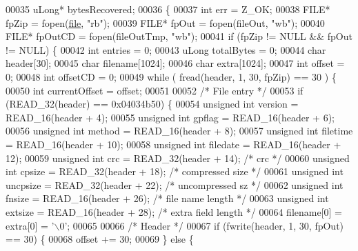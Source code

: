 \begin{DoxyCode}
00035 uLong* bytesRecovered;
00036 \{
00037   \textcolor{keywordtype}{int} err = Z\_OK;
00038   FILE* fpZip = fopen(\hyperlink{structfile}{file}, \textcolor{stringliteral}{"rb"});
00039   FILE* fpOut = fopen(fileOut, \textcolor{stringliteral}{"wb"});
00040   FILE* fpOutCD = fopen(fileOutTmp, \textcolor{stringliteral}{"wb"});
00041   \textcolor{keywordflow}{if} (fpZip != NULL &&  fpOut != NULL) \{
00042     \textcolor{keywordtype}{int} entries = 0;
00043     uLong totalBytes = 0;
00044     \textcolor{keywordtype}{char} header[30];
00045     \textcolor{keywordtype}{char} filename[1024];
00046     \textcolor{keywordtype}{char} extra[1024];
00047     \textcolor{keywordtype}{int} offset = 0;
00048     \textcolor{keywordtype}{int} offsetCD = 0;
00049     \textcolor{keywordflow}{while} ( fread(header, 1, 30, fpZip) == 30 ) \{
00050       \textcolor{keywordtype}{int} currentOffset = offset;
00051 
00052       \textcolor{comment}{/* File entry */}
00053       \textcolor{keywordflow}{if} (READ\_32(header) == 0x04034b50) \{
00054         \textcolor{keywordtype}{unsigned} \textcolor{keywordtype}{int} version = READ\_16(header + 4);
00055         \textcolor{keywordtype}{unsigned} \textcolor{keywordtype}{int} gpflag = READ\_16(header + 6);
00056         \textcolor{keywordtype}{unsigned} \textcolor{keywordtype}{int} method = READ\_16(header + 8);
00057         \textcolor{keywordtype}{unsigned} \textcolor{keywordtype}{int} filetime = READ\_16(header + 10);
00058         \textcolor{keywordtype}{unsigned} \textcolor{keywordtype}{int} filedate = READ\_16(header + 12);
00059         \textcolor{keywordtype}{unsigned} \textcolor{keywordtype}{int} crc = READ\_32(header + 14); \textcolor{comment}{/* crc */}
00060         \textcolor{keywordtype}{unsigned} \textcolor{keywordtype}{int} cpsize = READ\_32(header + 18); \textcolor{comment}{/* compressed size */}
00061         \textcolor{keywordtype}{unsigned} \textcolor{keywordtype}{int} uncpsize = READ\_32(header + 22); \textcolor{comment}{/* uncompressed sz */}
00062         \textcolor{keywordtype}{unsigned} \textcolor{keywordtype}{int} fnsize = READ\_16(header + 26); \textcolor{comment}{/* file name length */}
00063         \textcolor{keywordtype}{unsigned} \textcolor{keywordtype}{int} extsize = READ\_16(header + 28); \textcolor{comment}{/* extra field length */}
00064         filename[0] = extra[0] = \textcolor{charliteral}{'\(\backslash\)0'};
00065 
00066         \textcolor{comment}{/* Header */}
00067         \textcolor{keywordflow}{if} (fwrite(header, 1, 30, fpOut) == 30) \{
00068           offset += 30;
00069         \} \textcolor{keywordflow}{else} \{

\end{DoxyCode}
